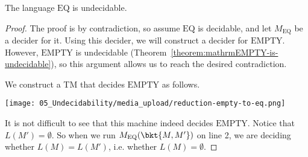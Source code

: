 \begin{flex}
\begin{theorem} \label{theorem:mathrmEQ-is-undecidable}
The language $\mathrm{EQ}$ is undecidable.
\end{theorem}

\begin{proof}
The proof is by contradiction, so assume $\text{EQ}$ is decidable, and let $M_\text{EQ}$ be a decider for it. Using this decider, we will construct a decider for $\text{EMPTY}$. However, $\text{EMPTY}$ is undecidable (Theorem~\ref{theorem:mathrmEMPTY-is-undecidable}), so this argument allows us to reach the desired contradiction.

We construct a TM that decides $\text{EMPTY}$ as follows.

\begin{center}
\texttt{[image: 05\_Undecidability/media\_upload/reduction-empty-to-eq.png]}
\end{center}

It is not difficult to see that this machine indeed decides $\text{EMPTY}$. Notice that $L(M') = \emptyset$. So when we run $M_\text{EQ}(\bkt{M,M'})$ on line 2, we are deciding whether $L(M) = L(M')$, i.e. whether $L(M) = \emptyset$.
\end{proof}
\end{flex}



